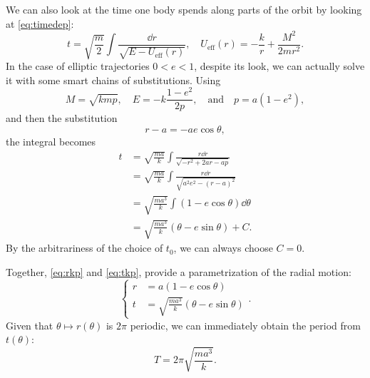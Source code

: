 \documentclass[english,fontsize=11pt,paper=b5]{scrbook}
\theoremstyle{definition}
\begin{document}
    We can also look at the time one body spends along parts of the orbit by looking at \eqref{eq:timedep}:
    \begin{equation}
      t = \sqrt{\frac{m}{2}}
      \int \frac{\dd r}{\sqrt{E - U_{\mathrm{eff}}(r)}}, \quad U_{\mathrm{eff}}(r) = -\frac kr + \frac {M^2}{2 m r^2}.
    \end{equation}
    In the case of elliptic trajectories $0<e<1$, despite its look, we can actually solve it with some smart chains of substitutions. Using
    \begin{equation}
      M = \sqrt{kmp}, \quad E = -k \frac{1-e^2}{2p}, \quad\mbox{and}\quad p= a(1-e^2),
    \end{equation}
    and then the substitution
    \begin{equation}\label{eq:rkp}
      r - a = - a e \cos \theta,
    \end{equation}
    the integral becomes
    \begin{align}
      t & = \sqrt{\frac {ma}k} \int \frac{r\dd r}{\sqrt{-r^2 + 2ar -ap}}      \\
        & = \sqrt{\frac {ma}k} \int \frac{r\dd r}{\sqrt{a^2e^2 - (r-a)^2}}    \\
        & = \sqrt{\frac{ma^3}{k}} \int (1- e \cos\theta) \dd \theta           \\
        & = \sqrt{\frac{ma^3}{k}} (\theta- e \sin\theta) + C. \label{eq:tkp}
    \end{align}
    By the arbitrariness of the choice of $t_0$, we can always choose $C=0$.

    Together, \eqref{eq:rkp} and \eqref{eq:tkp}, provide a parametrization of the radial motion:
    \begin{equation}
      \left\lbrace
        \begin{aligned}
          r & = a(1-e\cos\theta)                          \\
          t & = \sqrt{\frac{ma^3}k}(\theta - e\sin\theta)
        \end{aligned}
      \right..
    \end{equation}
    Given that $\theta\mapsto r(\theta)$ is $2\pi$ periodic, we can immediately obtain the period from $t(\theta)$:
    \begin{equation}
      T = 2\pi \sqrt{\frac{ma^3}k}.
    \end{equation}
\end{document}

